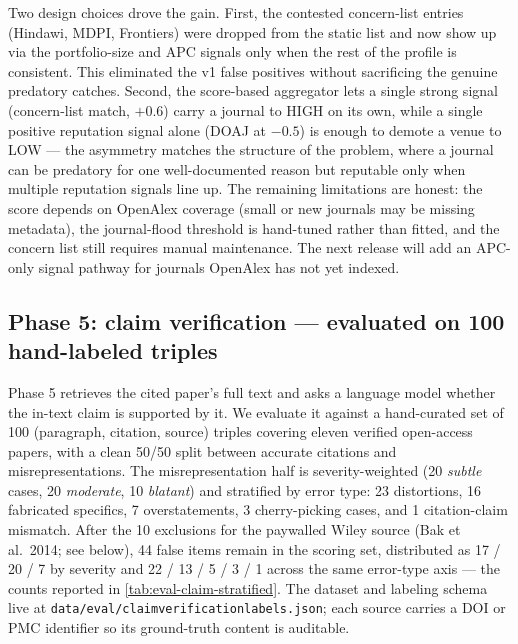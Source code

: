 \documentclass[12pt]{article}
\begin{document}
Two design choices drove the gain. First, the contested concern-list entries (Hindawi, MDPI, Frontiers) were dropped from the static list and now show up via the portfolio-size and APC signals only when the rest of the profile is consistent. This eliminated the v1 false positives without sacrificing the genuine predatory catches. Second, the score-based aggregator lets a single strong signal (concern-list match, $+0.6$) carry a journal to HIGH on its own, while a single positive reputation signal alone (DOAJ at $-0.5$) is enough to demote a venue to LOW --- the asymmetry matches the structure of the problem, where a journal can be predatory for one well-documented reason but reputable only when multiple reputation signals line up. The remaining limitations are honest: the score depends on OpenAlex coverage (small or new journals may be missing metadata), the journal-flood threshold is hand-tuned rather than fitted, and the concern list still requires manual maintenance. The next release will add an APC-only signal pathway for journals OpenAlex has not yet indexed.

\subsection{Phase 5: claim verification --- evaluated on 100 hand-labeled triples}\label{sec:eval-claims}

Phase 5 retrieves the cited paper's full text and asks a language model whether the in-text claim is supported by it. We evaluate it against a hand-curated set of 100 (paragraph, citation, source) triples covering eleven verified open-access papers, with a clean 50/50 split between accurate citations and misrepresentations. The misrepresentation half is severity-weighted (20 \textit{subtle} cases, 20 \textit{moderate}, 10 \textit{blatant}) and stratified by error type: 23 distortions, 16 fabricated specifics, 7 overstatements, 3 cherry-picking cases, and 1 citation-claim mismatch. After the 10 exclusions for the paywalled Wiley source (Bak et al.\ 2014; see below), 44 false items remain in the scoring set, distributed as 17 / 20 / 7 by severity and 22 / 13 / 5 / 3 / 1 across the same error-type axis --- the counts reported in \cref{tab:eval-claim-stratified}. The dataset and labeling schema live at \texttt{data/eval/\allowbreak{}claim\textunderscore verification\textunderscore labels.json}; each source carries a DOI or PMC identifier so its ground-truth content is auditable.
\end{document}

